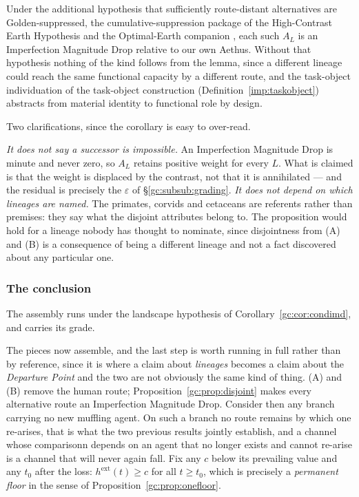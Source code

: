 \begin{example}
\begin{corollary}\label{gc:cor:condimd}
Under the additional hypothesis that sufficiently route-distant
alternatives are Golden-suppressed, the cumulative-suppression package
of the High-Contrast Earth Hypothesis and the Optimal-Earth companion
\cite{AethusOptimalEarth}, each such $A_L$ is an Imperfection Magnitude Drop
relative to our own Aethus. Without that hypothesis nothing of the kind
follows from the lemma, since a different lineage could reach the same
functional capacity by a different route, and the task-object
individuation of the task-object construction (Definition~\ref{imp:taskobject}) abstracts from material identity to
functional role by design.
\end{corollary}

Two clarifications, since the corollary is easy to over-read.

\emph{It does not say a successor is impossible.} An Imperfection
Magnitude Drop is minute and never zero, so $A_L$ retains positive
weight for every $L$. What is claimed is that the weight is displaced
by the contrast, not that it is annihilated --- and the residual is
precisely the $\varepsilon$ of \S\ref{gc:subsub:grading}. \emph{It does not depend on which lineages are named.} The primates,
corvids and cetaceans are referents rather than premises: they say what
the disjoint attributes belong to. The proposition would hold for a
lineage nobody has thought to nominate, since disjointness from (A) and
(B) is a consequence of being a different lineage and not a fact
discovered about any particular one.

\subsubsection{The conclusion}\label{gc:subsub:imdconclusion}

The assembly runs under the landscape hypothesis of
Corollary~\ref{gc:cor:condimd}, and carries its grade.

The pieces now assemble, and the last step is worth running in full
rather than by reference, since it is where a claim about \emph{lineages}
becomes a claim about the \emph{Departure Point} and the two are not
obviously the same kind of thing. (A) and (B) remove the human route;
Proposition~\ref{gc:prop:disjoint} makes every alternative route an
Imperfection Magnitude Drop. Consider then any branch carrying no new
muffling agent. On such a branch no route remains by which one
re-arises, that is what the two previous results jointly establish, and a channel whose comparisonn depends on an agent that no longer
exists and cannot re-arise is a channel that will never again fall.
Fix any $c$ below its prevailing value and any $t_0$ after the loss:
$h^{\mathrm{ext}}(t)\ge c$ for all $t\ge t_0$, which is precisely a
\emph{permanent floor} in the sense of
Proposition~\ref{gc:prop:onefloor}.


\end{example}
